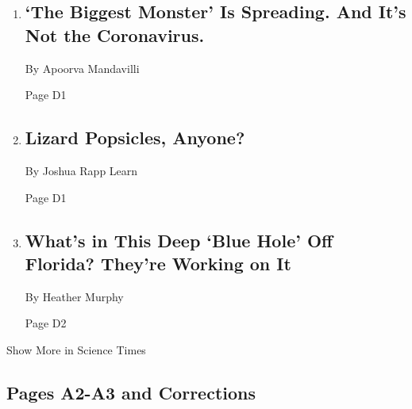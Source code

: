 \begin{enumerate}
\def\labelenumi{\arabic{enumi}.}
\item
  \href{/2020/08/03/health/coronavirus-tuberculosis-aids-malaria.html}{}

  \hypertarget{the-biggest-monster-is-spreading-and-its-not-the-coronavirus-1}{%
  \subsection{`The Biggest Monster' Is Spreading. And It's Not the
  Coronavirus.}\label{the-biggest-monster-is-spreading-and-its-not-the-coronavirus-1}}

  By Apoorva Mandavilli

  Page D1
\item
  \href{/2020/07/31/science/lizards-liolaemus-argentina.html}{}

  \hypertarget{lizard-popsicles-anyone}{%
  \subsection{Lizard Popsicles, Anyone?}\label{lizard-popsicles-anyone}}

  By Joshua Rapp Learn

  Page D1
\item
  \href{/2020/07/25/science/blue-hole-florida-ocean.html}{}

  \hypertarget{whats-in-this-deep-blue-hole-off-florida-theyre-working-on-it}{%
  \subsection{What's in This Deep `Blue Hole' Off Florida? They're
  Working on
  It}\label{whats-in-this-deep-blue-hole-off-florida-theyre-working-on-it}}

  By Heather Murphy

  Page D2
\end{enumerate}

Show More in Science Times

\hypertarget{pages-a2-a3-and-corrections}{%
\subsection{Pages A2-A3 and
Corrections}\label{pages-a2-a3-and-corrections}}

